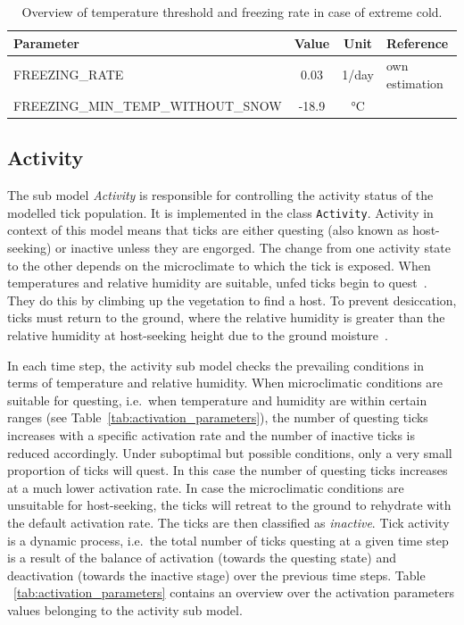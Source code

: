 \documentclass[a4paper, 11pt]{scrartcl}
\newcommand{\inlinecode}[1]{\texttt{\small #1}}
\begin{document}
\begin{table}[h!]
\caption[Overview of temperature threshold and freezing rate.]{Overview of temperature threshold and freezing rate in case of extreme cold.}
\label{tab:freezing_parameters}
\begin{tabularx}{\textwidth}{lccl}
\toprule
\textbf{Parameter}								& \textbf{Value} & \textbf{Unit}	& \textbf{Reference}  		\\
\midrule
\small{FREEZING\_RATE}		    			 	&   0.03    	& 1/day & own estimation 	\\
\small{FREEZING\_MIN\_TEMP\_WITHOUT\_SNOW}	   	&   -18.9    	& °C &  ~\textcite{Gray.2009} \\
\bottomrule
\end{tabularx}
\end{table}

\subsection{Activity}
The sub model \emph{Activity} is responsible for controlling the activity status of the modelled tick population. It is implemented in the class \inlinecode{Activity}. Activity in context of this model means that ticks are either questing (also known as host-seeking) or inactive unless they are engorged. The change from one activity state to the other depends on the microclimate to which the tick is exposed. When temperatures and relative humidity are suitable, unfed ticks begin to quest~\parencite{Perret.2000}. They do this by climbing up the vegetation to find a host. To prevent desiccation, ticks must return to the ground, where the relative humidity is greater than the relative humidity at host-seeking height due to the ground moisture~\parencite{Randolph.2004}.

In each time step, the activity sub model checks the prevailing conditions in terms of temperature and relative humidity. When microclimatic conditions are suitable for questing, i.e.\ when temperature and humidity are within certain ranges (see Table~\ref{tab:activation_parameters}), the number of questing ticks increases with a specific activation rate and the number of inactive ticks is reduced accordingly. Under suboptimal but possible conditions, only a very small proportion of ticks will quest. In this case the number of questing ticks increases at a much lower activation rate. In case the microclimatic conditions are unsuitable for host-seeking, the ticks will retreat to the ground to rehydrate with the default activation rate. The ticks are then classified as \emph{inactive}. Tick activity is a dynamic process, i.e.\ the total number of ticks questing at a given time step is a result of the balance of activation (towards the questing state) and deactivation (towards the inactive stage) over the previous time steps. Table ~\ref{tab:activation_parameters} contains an overview over the activation parameters values belonging to the activity sub model.
\end{document}
